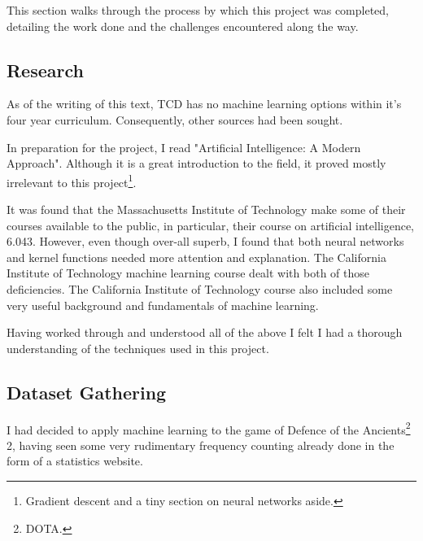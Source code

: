 \documentclass[a4paper, 12pt]{article}
\begin{document}
             \par This section walks through the process by which this project was completed, detailing the work done and the challenges encountered along the way.
             
             \subsection{Research}
             
                 \par As of the writing of this text, TCD has no machine learning options within it's four year curriculum. Consequently, other sources had been sought.
                 
                 \par In preparation for the project, I read "Artificial Intelligence: A Modern Approach"\cite{modernApproach}. Although it is a great introduction to the field, it proved mostly irrelevant to this project\footnote{Gradient descent and a tiny section on neural networks aside.}. 
                 
                 \par It was found that the Massachusetts Institute of Technology make some of their courses available to the public, in particular, their course on artificial intelligence, 6.043\cite{mit}. However, even though over-all superb, I found that both neural networks and kernel functions needed more attention and explanation. The California Institute of Technology machine learning course\cite{caltech} dealt with both of those deficiencies. The California Institute of Technology course also included some very useful background and fundamentals of machine learning. 
                 
                 \par Having worked through and understood all of the above I felt I had a thorough understanding of the techniques used in this project.
                 
             \subsection{Dataset Gathering}
             
                 \par I had decided to apply machine learning to the game of Defence of the Ancients\footnote{DOTA.} 2, having seen some very rudimentary frequency counting already done in the form of a statistics website\cite{dotabuff}.
                 
\end{document}
